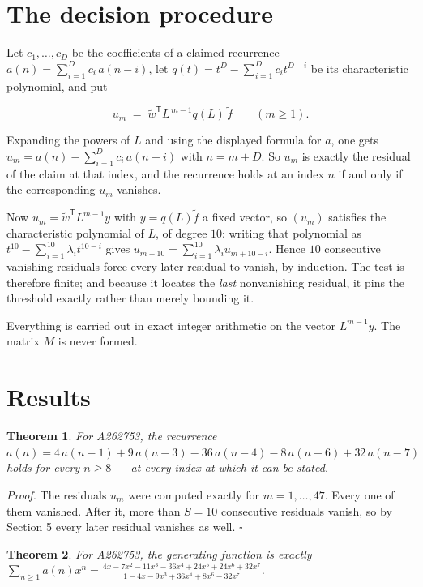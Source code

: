 \documentclass[11pt]{article}
\newtheorem{theorem}{Theorem}
\theoremstyle{definition}
\begin{document}
\section{The decision procedure}

Let $c_1,\dots,c_D$ be the coefficients of a claimed recurrence $a(n) = \sum_{i=1}^{D} c_i\,a(n-i)$, let $q(t) = t^{D} - \sum_{i=1}^{D} c_i t^{D-i}$ be its characteristic polynomial, and put

\[u_m \;=\; \tilde w^{\mathsf T} L^{\,m-1} q(L)\,\tilde f \qquad (m \ge 1).\]

Expanding the powers of $L$ and using the displayed formula for $a$, one gets $u_m = a(n) - \sum_{i=1}^{D} c_i\,a(n-i)$ with $n = m + D$. So $u_m$ is exactly the residual of the claim at that index, and the recurrence holds at an index $n$ if and only if the corresponding $u_m$ vanishes.

Now $u_m = \tilde w^{\mathsf T} L^{m-1} y$ with $y = q(L)\tilde f$ a fixed vector, so $(u_m)$ satisfies the characteristic polynomial of $L$, of degree $10$: writing that polynomial as $t^{10} - \sum_{i=1}^{10} \lambda_i t^{10-i}$ gives $u_{m+10} = \sum_{i=1}^{10} \lambda_i u_{m+10-i}$. Hence $10$ consecutive vanishing residuals force every later residual to vanish, by induction. The test is therefore finite; and because it locates the {\itshape last} nonvanishing residual, it pins the threshold exactly rather than merely bounding it.

Everything is carried out in exact integer arithmetic on the vector $L^{m-1}y$. The matrix $M$ is never formed.

\section{Results}

\begin{theorem} For A262753, the recurrence $a(n) = 4\,a(n-1) + 9\,a(n-3) - 36\,a(n-4) - 8\,a(n-6) + 32\,a(n-7)$ holds for every $n \ge 8$ --- at every index at which it can be stated.\end{theorem}

{\itshape Proof.} The residuals $u_m$ were computed exactly for $m = 1,\dots,47$. Every one of them vanished. After it, more than $S = 10$ consecutive residuals vanish, so by Section 5 every later residual vanishes as well. $\square$

\begin{theorem} For A262753, the generating function is exactly $\sum_{n\ge 1} a(n)x^n = \frac{4x - 7x^{2} - 11x^{3} - 36x^{4} + 24x^{5} + 24x^{6} + 32x^{7}}{1 - 4x - 9x^{3} + 36x^{4} + 8x^{6} - 32x^{7}}$.\end{theorem}
\end{document}
